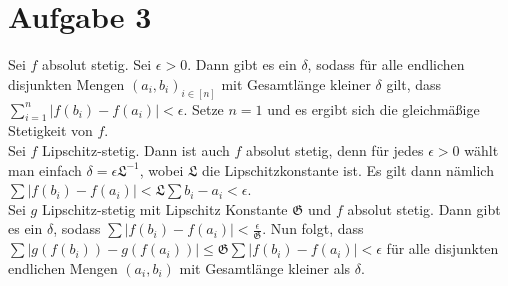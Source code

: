 \documentclass[a4paper]{article}
\theoremstyle{plain}
\begin{document}
\section*{Aufgabe 3}
Sei $f$ absolut stetig. Sei $\epsilon > 0$. Dann gibt es ein $\delta$, sodass für alle endlichen disjunkten Mengen $(a_i,b_i)_{i \in [n]}$ mit Gesamtlänge kleiner $\delta$ gilt, dass $\sum^n_{i=1} |f(b_i) - f(a_i)| < \epsilon$. Setze $n=1$ und es ergibt sich die gleichmäßige Stetigkeit von $f$. \\

Sei $f$ Lipschitz-stetig. Dann ist auch $f$ absolut stetig, denn für jedes $\epsilon > 0$ wählt man einfach $\delta = \epsilon \mathfrak L^{-1}$, wobei $\mathfrak L$ die Lipschitzkonstante ist. Es gilt dann nämlich $\sum| f(b_i) - f(a_i) | < \mathfrak L \sum b_i - a_i < \epsilon $.\\

Sei $g$ Lipschitz-stetig mit Lipschitz Konstante $\mathfrak G$ und $f$ absolut stetig. Dann gibt es ein $\delta$, sodass $\sum| f(b_i) - f(a_i)| < \frac{\epsilon}{\mathfrak G}$. Nun folgt, dass $\sum |g(f(b_i)) - g(f(a_i))| \leq  \mathfrak G \sum |f(b_i) - f(a_i)| < \epsilon$ für alle disjunkten endlichen Mengen $(a_i,b_i)$ mit Gesamtlänge kleiner als $\delta$. 
\end{document}
